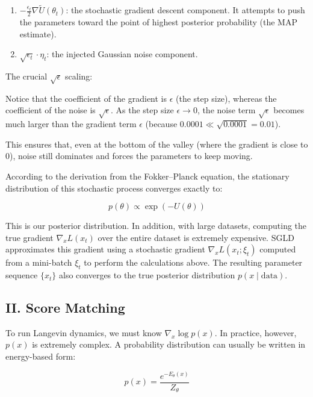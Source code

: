 \begin{enumerate}
\def\labelenumi{\arabic{enumi}.}
\tightlist
\item
  \(-\frac{\epsilon_t}{2}\nabla\tilde{U}(\theta_t)\): the stochastic gradient descent component. It attempts to push the parameters toward the point of highest posterior probability (the MAP estimate).
\item
  \(\sqrt{\epsilon_t}\cdot\eta_t\): the injected Gaussian noise component.
\end{enumerate}

The crucial \(\sqrt{\epsilon}\) scaling:

Notice that the coefficient of the gradient is \(\epsilon\) (the step size), whereas the coefficient of the noise is \(\sqrt{\epsilon}\). As the step size \(\epsilon\to 0\), the noise term \(\sqrt{\epsilon}\) becomes much larger than the gradient term \(\epsilon\) (because \(0.0001\ll\sqrt{0.0001}=0.01\)).

This ensures that, even at the bottom of the valley (where the gradient is close to 0), noise still dominates and forces the parameters to keep moving.

According to the derivation from the Fokker--Planck equation, the stationary distribution of this stochastic process converges exactly to:

\[
p(\theta)\propto \exp(-U(\theta))
\]

This is our posterior distribution.
In addition, with large datasets, computing the true gradient \(\nabla_x L(x_t)\) over the entire dataset is extremely expensive. SGLD approximates this gradient using a stochastic gradient \(\nabla_x L(x_t;\xi_t)\) computed from a mini-batch \(\xi_t\) to perform the calculations above. The resulting parameter sequence \(\{x_t\}\) also converges to the true posterior distribution \(p(x\mid\mathrm{data})\).

\hypertarget{ii.-score-matching}{%
\subsection{II. Score Matching}\label{ii.-score-matching}}

To run Langevin dynamics, we must know \(\nabla_x\log p(x)\). In practice, however, \(p(x)\) is extremely complex. A probability distribution can usually be written in energy-based form:

\[
p(x)=\frac{e^{-E_\theta(x)}}{Z_\theta}
\]

